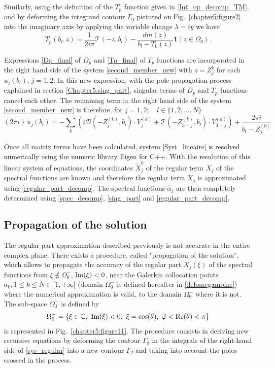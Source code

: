 Similarly, using the definition of the $T_p$ function given in \eqref{Int_op_decomp_TM}, and by deforming the integrand contour $\Gamma_0$ pictured on Fig.~\ref{chapter5:figure2} into the imaginary axis by applying the variable change $\lambda = iy$ we have
\begin{equation}
\label{Tp_final}
T_p(b_l,z) = 
\dfrac{1}{2i\pi} \mathcal T(-z,b_l) - \dfrac{dm(z)}{b_l - T_0(z)} \mathbf{1} (z \in \Omega_0) .
\end{equation}

Expressions \eqref{Dp_final} of $D_p$ and \eqref{Tp_final} of $T_p$ functions are incorporated in the right hand side of the system \eqref{second_member_new} with $z = Z_j^k$ for each $u_j(b_l), \, j=1,2$. In this new expression, with the pole propagation process explained in section \ref{Chapter5:sing_part}, singular terms of $D_p$ and $T_p$ functions cancel each other. The remaining term in the right hand side of the system \eqref{second_member_new} is therefore, for $j=1,2; \quad l \in \{ 1,2, \ldots, N \}$
\begin{equation}
(2\pi i) \, u_j(b_l) =  - \sum_k \left( i \mathcal D(-Z_j^{(k)},b_l)\cdot V_j^{(k)}  + \mathcal T(-Z_{3-j}^{(k)},b_l) 
\cdot V_{3-j}^{(k)}  \right) +  \dfrac{2\pi i}{b_l - Z_j^{(0)}}
\end{equation}

Once all matrix terms have been calculated, system \eqref{Syst_lineaire} is resolved numerically using the numeric library Eigen for C++. With the resolution of this linear system of equations, the coordinates $\tilde{X}_j^k$ of the regular term $X_j$ of the spectral functions are known and therefore the regular term $X_j$ is approximated using \eqref{regular_part_decomp}. The spectral functions $\hat{\alpha}_j$ are then completely determined using \eqref{spec_decomp}, \eqref{sing_part} and \eqref{regular_part_decomp}. 

\subsection{Propagation of the solution}
\label{propag_sol}
The regular part approximation described previously is not accurate in the entire complex plane. There exists a procedure, called "propagation of the solution", which allows to propagate the accuracy of the regular part $X_j(\xi)$ of the spectral functions from $\xi \notin \Omega_0^-$, ${\rm Im} (\xi) <0$, near the Galerkin collocation points $a_k, 1\leq k \leq N \in \lbrack 1, +\infty \lbrack$ (domain $\Omega_0^-$ is defined hereafter in \eqref{defomegamoins}) where the numerical approximation is valid, to the domain $\Omega_0^-$ where it is not. The sub-space $\Omega_0^-$ is defined by
\begin{equation}
\label{defomegamoins}
\Omega_0^- = \{\xi \in \mathbb C, \ {\rm Im}(\xi) <0, \  \xi=\cos(\theta), \ \tilde{\varphi} < {\rm Re}(\theta)<\pi\}
\end{equation}
is represented in Fig.~\ref{chapter5:figure11}. The procedure consists in deriving new recursive equations by deforming the  contour $\Gamma_0$ in the integrals of the right-hand side of \eqref{sys_regular} into a new contour $\Gamma_2$ and taking into account the poles crossed in the process.

